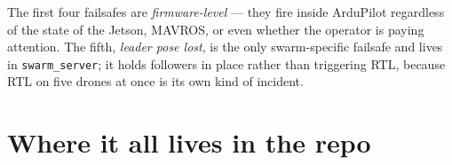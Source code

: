 \documentclass[11pt,a4paper]{article}
\begin{document}
\begin{tcolorbox}[colback=bggrey, colframe=linegrey!50, arc=2pt, boxrule=0.4pt,
                  title={\small\bfseries One distinction worth keeping straight}, fonttitle=\color{fcblue}]
The first four failsafes are \emph{firmware-level} --- they fire inside ArduPilot
regardless of the state of the Jetson, MAVROS, or even whether the operator is
paying attention. The fifth, \emph{leader pose lost}, is the only swarm-specific
failsafe and lives in \texttt{swarm\_server}; it holds followers in place rather
than triggering RTL, because RTL on five drones at once is its own kind of
incident.
\end{tcolorbox}

\newpage

\section{Where it all lives in the repo}
\end{document}
